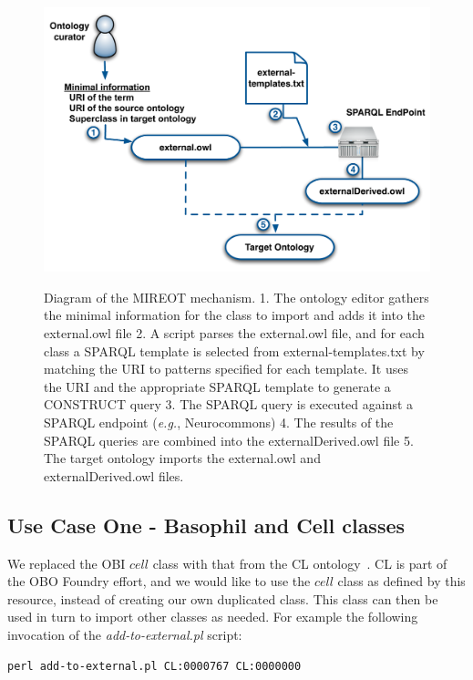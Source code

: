 \documentclass{ao2e}%
\begin{document}
\begin{figure}[t]
\centering
{
\includegraphics[width=.9\linewidth]{./figs/mechanism2.pdf}
}
\caption{Diagram of the MIREOT mechanism.
1. The ontology editor gathers the minimal information for the class to import and adds it into the external.owl file
2. A script parses the external.owl file, and for each class a SPARQL template is selected from external-templates.txt by matching the URI to patterns specified for each template. It uses the URI and the appropriate SPARQL template to generate a CONSTRUCT query
3. The SPARQL query is executed against a SPARQL endpoint (\emph{e.g.}, Neurocommons)
4. The results of the SPARQL queries are combined into the externalDerived.owl file
5. The target ontology imports the external.owl and externalDerived.owl files.
}
\label{fig:mechanism2}
\end{figure}




\subsection*{Use Case One - Basophil and Cell classes}

We replaced the \ac{OBI} $cell$ class with that from the \ac{CL} ontology~\cite{CL}. 
\ac{CL} is part of the \ac{OBO} Foundry effort, and we would like to use the $cell$ class as defined by this resource, instead of creating our own duplicated class.
This class can then be used in turn to import other classes as needed.
For example the following invocation of the \emph{add-to-external.pl} script:

\begin{footnotesize}
\begin{verbatim}
perl add-to-external.pl CL:0000767 CL:0000000 
\end{verbatim}
\end{footnotesize}
\end{document}

